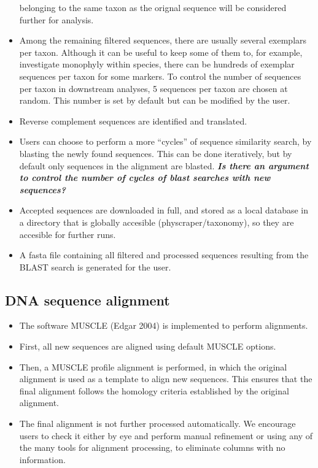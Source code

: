 \documentclass[draft]{ametsoc}
\begin{document}
\begin{itemize}
  belonging to the same taxon as the orignal sequence will be considered
  further for analysis.
\item
  Among the remaining filtered sequences, there are usually several
  exemplars per taxon. Although it can be useful to keep some of them
  to, for example, investigate monophyly within species, there can be
  hundreds of exemplar sequences per taxon for some markers. To control
  the number of sequences per taxon in downstream analyses, 5 sequences
  per taxon are chosen at random. This number is set by default but can
  be modified by the user.
\item
  Reverse complement sequences are identified and translated.
\item
  Users can choose to perform a more ``cycles'' of sequence similarity
  search, by blasting the newly found sequences. This can be done
  iteratively, but by default only sequences in the alignment are
  blasted. \textbf{\emph{Is there an argument to control the number of
  cycles of blast searches with new sequences?}}
\item
  Accepted sequences are downloaded in full, and stored as a local
  database in a directory that is globally accesible
  (physcraper/taxonomy), so they are accesible for further runs.
\item
  A fasta file containing all filtered and processed sequences resulting
  from the BLAST search is generated for the user.
\end{itemize}

\hypertarget{dna-sequence-alignment}{%
\subsection{DNA sequence alignment}\label{dna-sequence-alignment}}

\begin{itemize}
\tightlist
\item
  The software MUSCLE (Edgar 2004) is implemented to perform alignments.
\item
  First, all new sequences are aligned using default MUSCLE options.
\item
  Then, a MUSCLE profile alignment is performed, in which the original
  alignment is used as a template to align new sequences. This ensures
  that the final alignment follows the homology criteria established by
  the original alignment.
\item
  The final alignment is not further processed automatically. We
  encourage users to check it either by eye and perform manual
  refinement or using any of the many tools for alignment processing, to
  eliminate columns with no information.
\end{itemize}
\end{document}
